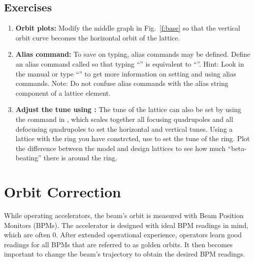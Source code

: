 \documentclass{hitec}     %
\begin{document}
{{{{\vspace{1in}

\subsection{Exercises}

\begin{enumerate}[leftmargin=*]
%
\item {\bf Orbit plots:} Modify the middle graph in Fig.~\ref{f:base} so that the vertical orbit curve becomes the horizontal orbit of the  lattice.
%
\item {\bf Alias command:} To save on typing, alias commands may be defined. Define an alias command called  so that typing ``'' is equivalent to ``''. Hint: Look in the manual or type ``'' to get more information on setting and using alias commands.
Note: Do not confuse \tao alias commands with the alias string component of a lattice element.
%
\item {\bf Adjust the tune using :} The tune of the lattice can also be set by using the  command in \tao, which scales together all focusing quadrupoles and all defocusing quadrupoles to set the horizontal and vertical tunes. Using a lattice with the ring you have constrcted, use  to set the tune of the ring. Plot the difference between the model and design lattices to see how much ``beta-beating'' there is around the ring.
%
\end{enumerate}

\newpage

\section{Orbit Correction}
\label{s:orbit}

While operating accelerators, the beam's orbit is measured with Beam Position Monitors (BPMs). The accelerator is designed with ideal BPM readings in mind, which are often 0. After extended operational experience, operators learn good readings for all BPMs that are referred to as golden orbits. It then becomes important to change the beam's trajectory to obtain the desired BPM readings.

}}}}
\end{document}
